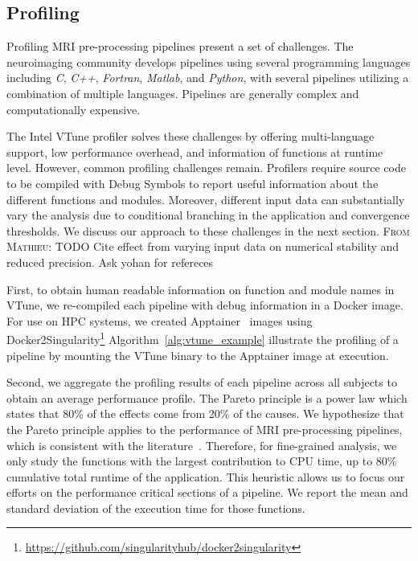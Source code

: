 \documentclass[conference]{IEEEtran}
\renewcommand{\lstlistingname}{Algorithm}
\newcommand{\MD}[1]{\color{magenta}\textsc{From Mathieu: }#1\color{black}}
\begin{document}
\subsection{Profiling}
Profiling MRI pre-processing pipelines present a set of challenges. The neuroimaging community develops pipelines using several programming languages including \textit{C}, \textit{C++}, \textit{Fortran}, \textit{Matlab}, and \textit{Python}, with several pipelines utilizing a combination of multiple languages. Pipelines are generally complex and computationally expensive.

The Intel VTune profiler solves these challenges by offering multi-language support, low performance overhead, and information of functions at runtime level. However, common profiling challenges remain. Profilers require source code to be compiled with Debug Symbols to report useful information about the different functions and modules. Moreover, different input data can substantially vary the analysis due to conditional branching in the application and convergence thresholds. We discuss our approach to these challenges in the next section.
\MD{TODO Cite effect from varying input data on numerical stability and reduced precision. Ask yohan for refereces}
		
First, to obtain human readable information on function and module names in VTune, we re-compiled each pipeline with debug information in a Docker image. For use on HPC systems, we created Apptainer~\cite{Kurtzer2017-bu} images using Docker2Singularity\footnote{\href{https://github.com/singularityhub/docker2singularity}{https://github.com/singularityhub/docker2singularity}} \lstlistingname~\ref{alg:vtune_example} illustrate the profiling of a pipeline by mounting the VTune binary to the Apptainer image at execution.

\begin{minipage}{\linewidth}
	
\end{minipage}
				
Second, we aggregate the profiling results of each pipeline across all subjects to obtain an average performance profile. The Pareto principle is a power law which states that 80\% of the effects come from 20\% of the causes. We hypothesize that the Pareto principle applies to the performance of MRI pre-processing pipelines, which is consistent with the literature~\cite{Kukunas2015-jd}. Therefore, for fine-grained analysis, we only study the functions with the largest contribution to CPU time, up to 80\% cumulative total runtime of the application. This heuristic allows us to focus our efforts on the performance critical sections of a pipeline. We report the mean and standard deviation of the execution time for those functions.
			
\end{document}
